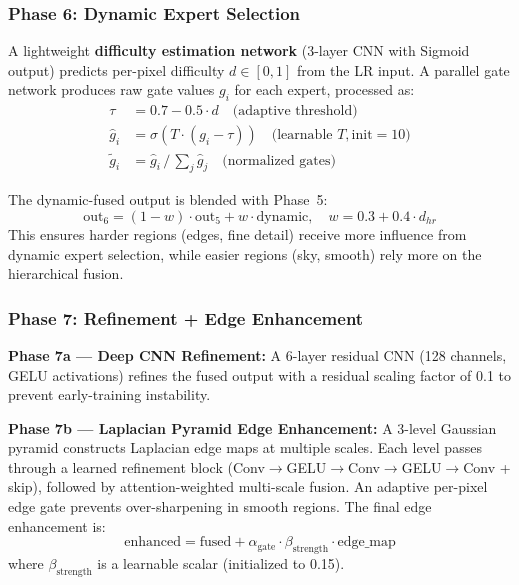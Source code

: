 \documentclass[10pt,twocolumn,letterpaper]{article}
\begin{document}
\subsubsection{Phase 6: Dynamic Expert Selection}

A lightweight \textbf{difficulty estimation network} (3-layer CNN with Sigmoid output) predicts per-pixel difficulty $d \in [0,1]$ from the LR input. A parallel gate network produces raw gate values $g_i$ for each expert, processed as:
\begin{align}
\tau &= 0.7 - 0.5 \cdot d \quad \text{(adaptive threshold)} \\
\hat{g}_i &= \sigma\!\left(T \cdot (g_i - \tau)\right) \quad \text{(learnable } T, \text{init}=10\text{)} \\
\tilde{g}_i &= \hat{g}_i \,/\, {\textstyle\sum_j \hat{g}_j} \quad \text{(normalized gates)}
\end{align}

The dynamic-fused output is blended with Phase~5:
\begin{equation}
\text{out}_6 = (1 - w) \cdot \text{out}_5 + w \cdot \text{dynamic}, \quad w = 0.3 + 0.4 \cdot d_{hr}
\end{equation}
This ensures harder regions (edges, fine detail) receive more influence from dynamic expert selection, while easier regions (sky, smooth) rely more on the hierarchical fusion.

\subsubsection{Phase 7: Refinement + Edge Enhancement}

\noindent\textbf{Phase 7a --- Deep CNN Refinement:}
A 6-layer residual CNN (128 channels, GELU activations) refines the fused output with a residual scaling factor of 0.1 to prevent early-training instability.

\noindent\textbf{Phase 7b --- Laplacian Pyramid Edge Enhancement:}
A 3-level Gaussian pyramid constructs Laplacian edge maps at multiple scales. Each level passes through a learned refinement block (Conv$\to$GELU$\to$Conv$\to$GELU$\to$Conv + skip), followed by attention-weighted multi-scale fusion. An adaptive per-pixel edge gate prevents over-sharpening in smooth regions. The final edge enhancement is:
\begin{equation}
\text{enhanced} = \text{fused} + \alpha_{\text{gate}} \cdot \beta_{\text{strength}} \cdot \text{edge\_map}
\end{equation}
where $\beta_{\text{strength}}$ is a learnable scalar (initialized to 0.15).
\end{document}
